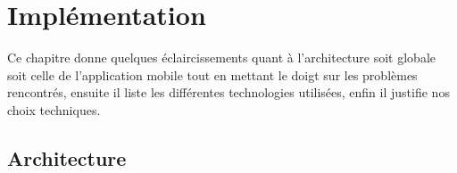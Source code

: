 \chapter{Implémentation}

Ce chapitre donne quelques éclaircissements quant à l'architecture soit globale soit celle de l'application mobile tout en mettant le doigt sur les problèmes rencontrés, ensuite il liste les différentes technologies utilisées, enfin il justifie nos choix techniques.
\section{Architecture} %
\label{sec:architecture}
